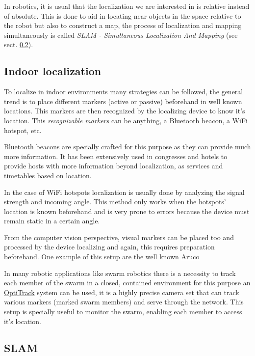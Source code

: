       In robotics, it is usual that the localization we are interested in is relative instead of absolute. This is done to aid in locating near objects in the space relative to the robot but also to construct a map, the process of localization and mapping simultaneously is called \textit{SLAM - Simultaneous Localization And Mapping} (see sect. \ref{ch_sota:sect:localization:slam}).

    \subsection{Indoor localization} \label{ch_sota:sect:localization:indoor}

      To localize in indoor environments many strategies can be followed, the general trend is to place different markers (active or passive) beforehand in well known locations. This markers are then recognized by the localizing device to know it's location. This \textit{recognizable markers} can be anything, a Bluetooth beacon, a WiFi hotspot, etc.

      Bluetooth beacons are specially crafted for this purpose as they can provide much more information. It has been extensively used in congresses and hotels to provide hosts with more information beyond localization, as services and timetables based on location. 

      In the case of WiFi hotspots localization is usually done by analyzing the signal strength and incoming angle. This method only works when the hotspots' location is known beforehand and is very prone to errors because the device must remain static in a certain angle.

      From the computer vision perspective, visual markers can be placed too and processed by the device localizing and again, this requires preparation beforehand. One example of this setup are the well known \href{https://www.uco.es/investiga/grupos/ava/node/26}{Aruco}

      In many robotic applications like swarm robotics there is a necessity to track each member of the swarm in a closed, contained environment for this purpose an \href{http://www.optitrack.com/}{OptiTrack} system can be used, it is a highly precise camera set that can track various markers (marked swarm members) and serve through the network. This setup is specially useful to monitor the swarm, enabling each member to access it's location.

    \subsection{SLAM} \label{ch_sota:sect:localization:slam}

